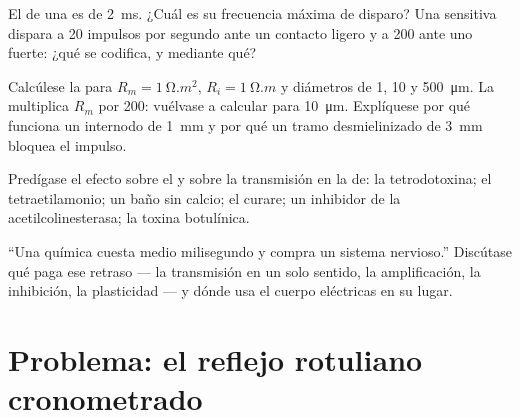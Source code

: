 \begin{exercise}[$\star\star$]\label{exo:b2:neurons-synapses:9}
El  de una  es de \qty{2}{ms}. ¿Cuál es su
frecuencia máxima de disparo? Una  sensitiva dispara a 20 impulsos
por segundo ante un contacto ligero y a 200 ante uno fuerte: ¿qué se
codifica, y mediante qué?
\end{exercise}

\begin{exercise}[$\star\star\star$]\label{exo:b2:neurons-synapses:10}
Calcúlese la  para $R_m = \qty{1}{\ohm.m^2}$, $R_i =
\qty{1}{\ohm.m}$ y diámetros de 1, 10 y \qty{500}{\micro m}. La 
multiplica $R_m$ por 200: vuélvase a calcular para \qty{10}{\micro m}.
Explíquese por qué funciona un internodo de \qty{1}{mm} y por qué un tramo
desmielinizado de \qty{3}{mm} bloquea el impulso.
\end{exercise}

\begin{exercise}[$\star\star\star$]\label{exo:b2:neurons-synapses:11}
Predígase el efecto sobre el  y sobre la transmisión en
la  de: la tetrodotoxina; el tetraetilamonio; un baño
sin calcio; el curare; un inhibidor de la acetilcolinesterasa; la toxina
botulínica.
\end{exercise}

\begin{exercise}[$\star\star\star$]\label{exo:b2:neurons-synapses:12}
``Una  química cuesta medio milisegundo y compra un sistema
nervioso.'' Discútase qué paga ese retraso --- la transmisión en un solo
sentido, la amplificación, la inhibición, la plasticidad --- y dónde usa el
cuerpo  eléctricas en su lugar.
\end{exercise}

\section{Problema: el reflejo rotuliano cronometrado}

